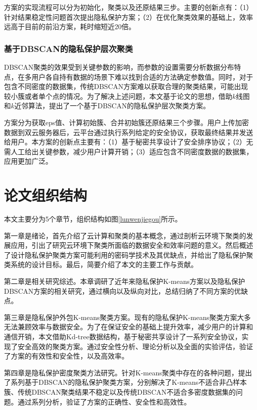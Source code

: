 方案的实现流程可以分为初始化，聚类以及还原结果三步。主要的创新点有：（1）针对结果稳定性问题首次提出隐私保护方案；（2）在优化聚类效果的基础上，效率远高于目前的前沿方案\cite{bozdemir2021privacy}，耗时缩短近20倍。

\subsubsection{基于DBSCAN的隐私保护层次聚类}
DBSCAN聚类的效果受到关键参数的影响，而参数的设置需要分析数据分布特点，在多用户各自持有数据的场景下难以找到合适的方法确定参数值。同时，对于包含不同密度的数据集，传统DBSCAN方案难以获取合理的聚类结果，可能出现较小簇或者单个点的情况。为了解决上述问题，本文基于论文\cite{latifi2021dbhc}的思想，借助$ k $线图和$ k $近邻算法，提出了一个基于DBSCAN的隐私保护层次聚类方案。

方案分为获取eps值、计算初始簇、合并初始簇还原结果三个步骤。用户上传加密数据到双云服务器后，云平台通过执行系列给定的安全协议，获取最终结果并发送给用户。本方案的创新点主要有：（1）基于秘密共享设计了安全排序协议；（2）无需人工给出关键参数，减少用户计算开销；（3）适应包含不同密度数据的数据集，应用更加广泛。

\section{论文组织结构}

本文主要分为5个章节，组织结构如图\ref{lunwenjiegou}所示。

第一章是绪论，首先介绍了云计算和聚类的基本概念，通过剖析云环境下聚类的发展应用，引出了研究云环境下聚类所面临的数据安全和效率问题的意义。然后概述了设计隐私保护聚类方案可能利用的密码学技术及其优缺点，并给出了隐私保护聚类系统的设计目标。最后，简要介绍了本文的主要工作与贡献。

第二章是相关研究综述。本章调研了近年来隐私保护K-means方案以及隐私保护DBSCAN方案的相关研究，通过横向以及纵向对比，总结归纳了不同方案的优缺点。

第三章是隐私保护外包K-means聚类方案。现有的隐私保护K-means聚类方案大多无法兼顾效率与数据安全。为了在保证安全的基础上提升效率，减少用户的计算和通信开销，本文借助Kd-tree数据结构，基于秘密共享设计了一系列安全协议，实现了安全高效的聚类方案。通过安全性分析、理论分析以及全面的实验评估，验证了方案的有效性和安全性，以及高效率。

第四章是隐私保护密度聚类方法研究。针对K-means聚类中存在的各种问题，提出了系列基于DBSCAN的隐私保护聚类方案，分别解决了K-means不适合非凸样本簇、传统DBSCAN聚类结果不稳定以及传统DBSCAN不适合多密度数据集的问题。通过系列分析，验证了方案的正确性、安全性和高效性。

